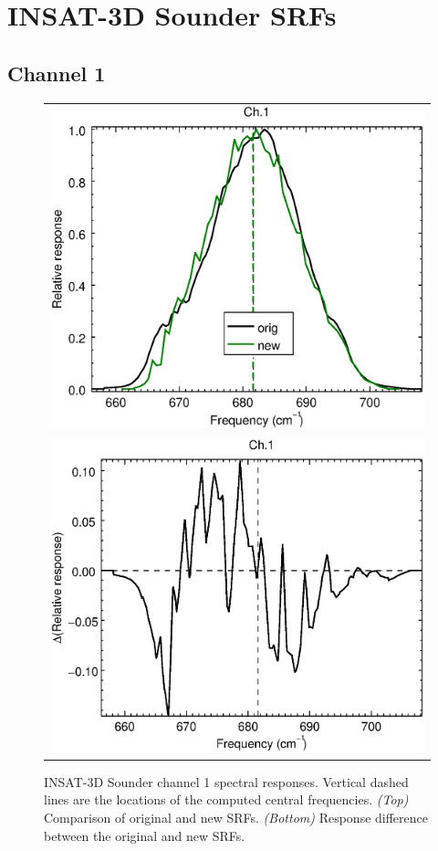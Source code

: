 \section{INSAT-3D Sounder SRFs}
\label{app.sndr_srf_data_plots}

\subsection{Channel 1}
\begin{figure}[H]
  \centering
  \begin{tabular}{c}
    \includegraphics[scale=0.55]{graphics/sndr/srf/sndr_insat3d-1.eps} \\
    \includegraphics[scale=0.55]{graphics/sndr/srf/sndr_insat3d-1.difference.eps}
  \end{tabular}
  \caption{INSAT-3D Sounder channel 1 spectral responses. Vertical dashed lines are the locations of the computed central frequencies. \emph{(Top)} Comparison of original and new SRFs. \emph{(Bottom)} Response difference between the original and new SRFs.}
  \label{fig:sndr_ch1}
\end{figure}

